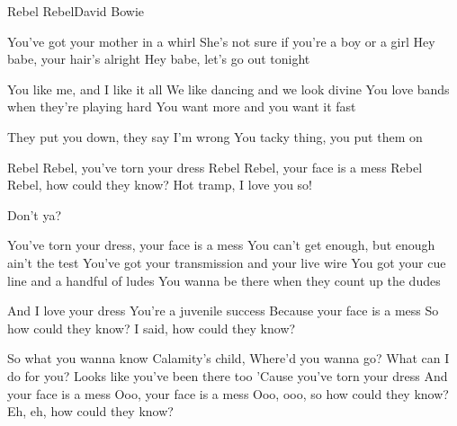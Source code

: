 \begin{Song}{Rebel Rebel}{David Bowie}
\begin{multicols}{2}

\begin{Verse}
You've got your mother in a whirl
She's not sure if you're a boy or a girl
Hey babe, your hair's alright
Hey babe, let's go out tonight
\espaceInterStrophe

You like me, and I like it all
We like dancing and we look divine
You love bands when they're playing hard
You want more and you want it fast
\end{Verse}
\espaceInterStrophe

\begin{PreChorus}
They put you down, they say I'm wrong
You tacky thing, you put them on
\end{PreChorus}
\espaceInterStrophe

\begin{Chorus}
Rebel Rebel, you've torn your dress
Rebel Rebel, your face is a mess
Rebel Rebel, how could they know?
Hot tramp, I love you so!

Don't ya?
\end{Chorus}
\espaceInterStrophe

\espaceInterStrophe

\tochorus[x2]
\columnbreak

\begin{Verse}
You've torn your dress, your face is a mess
You can't get enough, but enough ain't the test
You've got your transmission and your live wire
You got your cue line and a handful of ludes
You wanna be there when they count up the dudes
\espaceInterStrophe

And I love your dress
You're a juvenile success
Because your face is a mess
So how could they know?
I said, how could they know?
\espaceInterStrophe

So what you wanna know Calamity's child,
Where'd you wanna go?
What can I do for you? Looks like you've been there too
'Cause you've torn your dress
And your face is a mess
Ooo, your face is a mess
Ooo, ooo, so how could they know?
Eh, eh, how could they know?
\end{Verse}
\espaceInterStrophe

\vfill
~
\end{multicols}

\vfill

\begin{multicols}{2}


\end{multicols}
\end{Song}
